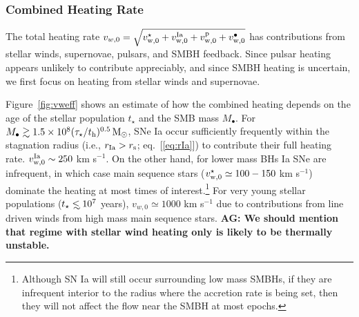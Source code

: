 \documentclass[usenatbib,fleqn]{mn2e}
\newcommand\lsim{\mathrel{\rlap{\lower4pt\hbox{\hskip1pt$\sim$}}
    \raise1pt\hbox{$<$}}}
\newcommand{\Mbh}[1][]{M_{\bullet#1}}
\newcommand{\vwO}{v_{w,0}}
\newcommand{\tage}{t_{\star}}
\begin{document}
\subsubsection{Combined Heating Rate} 

The total heating rate $\vwO = \sqrt{v_{\rm w,0}^{\star} + v_{\rm w,0}^{\rm Ia} + v_{\rm w,0}^{\rm p} + v_{\rm w,0}^{\bullet}}$ has contributions from stellar winds, supernovae, pulsars, and SMBH feedback.  Since pulsar heating appears unlikely to contribute appreciably, and since SMBH heating is uncertain, we first focus on heating from stellar winds and supernovae.  

Figure~\ref{fig:vweff} shows an estimate of how the combined heating
depends on the age of the stellar population $\tage$ and the SMB mass
$\Mbh$.  For $M_{\bullet} \gtrsim 1.5\times 10^8 (\tau_{\star}/t_{\rm
  h})^{0.5} \,{\rm M_\odot}$, SNe Ia occur sufficiently frequently within the
stagnation radius (i.e., $r_{\rm Ia} > r_{\rm s}$; eq.~[\ref{eq:rIa}])
to contribute their full heating rate.  $v_{\rm w,0}^{\rm Ia} \sim
250$ km s$^{-1}$.  On the other hand, for lower mass BHs Ia SNe are
infrequent, in which case main sequence stars ($v_{\rm w,0}^{\star}
\simeq 100-150$ km s$^{-1}$) dominate the heating at most times of
interest.\footnote{Although SN Ia will still occur surrounding low
  mass SMBHs, if they are infrequent interior to the radius where the
  accretion rate is being set, then they will not affect the flow near
  the SMBH at most epochs.}  For very young stellar populations
($\tage \lsim 10^7$ years), $\vwO\simeq 1000$ km s$^{-1}$ due to
contributions from line driven winds from high mass main sequence
stars.
{\bf AG: We should mention that regime with stellar wind heating only
  is likely to be thermally unstable.}
\end{document}
